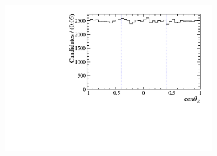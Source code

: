 \begin{figure}[!ht]
\begin{subfigure}[t]{0.32\textwidth}
        \includegraphics[width=1.0\textwidth]{figs/B2DsPhi/f0_Helicity.pdf}
    \end{subfigure}\\
     

\end{figure}
